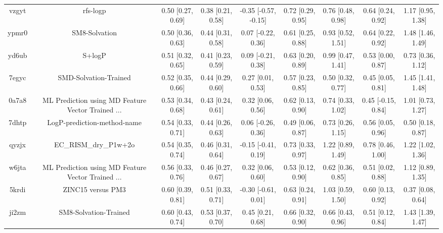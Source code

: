 \documentclass{article}
\begin{document}
\begin{center}
\begin{longtable}{|ccccccccc|}
 vzgyt &                                           rfs-logp &  0.50 [0.27, 0.69] &  0.38 [0.21, 0.58] &  -0.35 [-0.57, -0.15] &  0.72 [0.29, 0.95] &    0.76 [0.48, 0.98] &    0.64 [0.24, 0.92] &     1.17 [0.95, 1.38] \\
 ypmr0 &                                      SM8-Solvation &  0.50 [0.36, 0.63] &  0.44 [0.31, 0.58] &    0.07 [-0.22, 0.36] &  0.61 [0.25, 0.88] &    0.93 [0.52, 1.51] &    0.64 [0.22, 0.92] &     1.48 [1.46, 1.49] \\
 yd6ub &                                             S+logP &  0.51 [0.32, 0.65] &  0.41 [0.23, 0.59] &    0.09 [-0.21, 0.38] &  0.63 [0.20, 0.89] &    0.99 [0.47, 1.41] &    0.53 [0.00, 0.87] &     0.73 [0.36, 1.12] \\
 7egyc &                              SMD-Solvation-Trained &  0.52 [0.35, 0.66] &  0.44 [0.29, 0.60] &     0.27 [0.01, 0.53] &  0.57 [0.23, 0.85] &    0.50 [0.32, 0.77] &    0.45 [0.05, 0.81] &     1.45 [1.41, 1.48] \\
 0a7a8 &  ML Prediction using MD Feature Vector Trained ... &  0.53 [0.34, 0.68] &  0.43 [0.24, 0.61] &     0.32 [0.06, 0.56] &  0.62 [0.13, 0.90] &    0.74 [0.33, 1.02] &   0.45 [-0.15, 0.84] &     1.01 [0.73, 1.27] \\
 7dhtp &                        LogP-prediction-method-name &  0.54 [0.33, 0.71] &  0.44 [0.26, 0.63] &    0.06 [-0.26, 0.36] &  0.49 [0.06, 0.87] &    0.73 [0.26, 1.15] &    0.56 [0.05, 0.96] &     0.50 [0.18, 0.87] \\
 qyzjx &                              EC\_RISM\_dry\_P1w+2o &  0.54 [0.35, 0.74] &  0.46 [0.31, 0.64] &   -0.15 [-0.41, 0.19] &  0.73 [0.33, 0.97] &    1.22 [0.89, 1.49] &    0.78 [0.46, 1.00] &     1.22 [1.02, 1.36] \\
 w6jta &  ML Prediction using MD Feature Vector Trained ... &  0.56 [0.33, 0.76] &  0.46 [0.27, 0.67] &     0.32 [0.06, 0.60] &  0.53 [0.12, 0.90] &    0.62 [0.36, 0.85] &    0.51 [0.02, 0.88] &     1.12 [0.89, 1.35] \\
 5krdi &                                  ZINC15 versus PM3 &  0.60 [0.39, 0.81] &  0.51 [0.33, 0.71] &   -0.30 [-0.61, 0.01] &  0.63 [0.24, 0.91] &    1.03 [0.59, 1.50] &    0.60 [0.13, 0.92] &     0.37 [0.08, 0.64] \\
 ji2zm &                              SM8-Solvation-Trained &  0.60 [0.43, 0.74] &  0.53 [0.37, 0.70] &     0.45 [0.21, 0.68] &  0.66 [0.32, 0.90] &    0.66 [0.43, 0.96] &    0.51 [0.12, 0.84] &     1.43 [1.39, 1.47] \\

\end{longtable}
\end{center}
\end{document}
